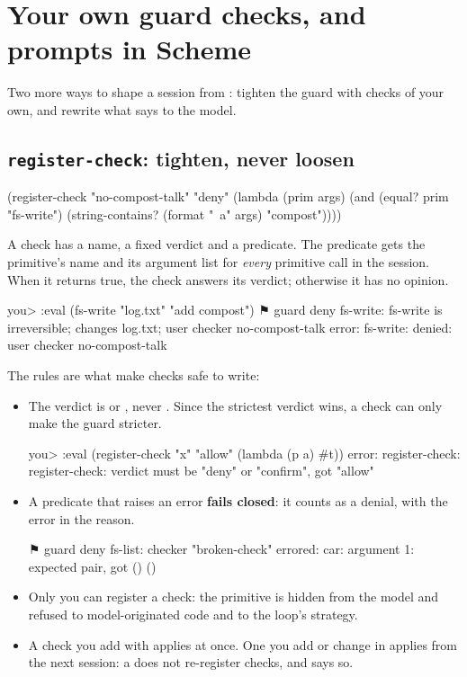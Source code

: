\chapter{Your own guard checks, and prompts in Scheme}
\label{ch:checks}

Two more ways to shape a session from : tighten the guard
with checks of your own, and rewrite what \nodwyn{} says to the model.

\section{\texttt{register-check}: tighten, never loosen}

\begin{scm}
(register-check "no-compost-talk" "deny"
  (lambda (prim args)
    (and (equal? prim "fs-write")
         (string-contains? (format "~a" args) "compost"))))
\end{scm}

A check has a name, a fixed verdict and a predicate. The predicate gets the
primitive's name and its argument list for \emph{every} primitive call in
the session. When it returns true, the check answers its verdict; otherwise
it has no opinion.

\begin{txt}
you> :eval (fs-write "log.txt" "add compost")
⚑ guard deny fs-write: fs-write is irreversible; changes log.txt; user checker no-compost-talk
error: fs-write: denied: user checker no-compost-talk
\end{txt}

The rules are what make checks safe to write:

\begin{itemize}
  \item The verdict is  or , never
    . Since the strictest verdict wins, a check can only make
    the guard stricter.
\begin{txt}
you> :eval (register-check "x" "allow" (lambda (p a) #t))
error: register-check: register-check: verdict must be "deny" or "confirm", got "allow"
\end{txt}
  \item A predicate that raises an error \textbf{fails closed}: it counts as
    a denial, with the error in the reason.
\begin{txt}
⚑ guard deny fs-list: checker "broken-check" errored: car: argument 1: expected pair, got () ()
\end{txt}
  \item Only you can register a check: the primitive is hidden from the
    model and refused to model-originated code and to the loop's strategy.
  \item A check you add with  applies at once. One you add or
    change in  applies from the next session: a
     does not re-register checks, and says so.
\end{itemize}

